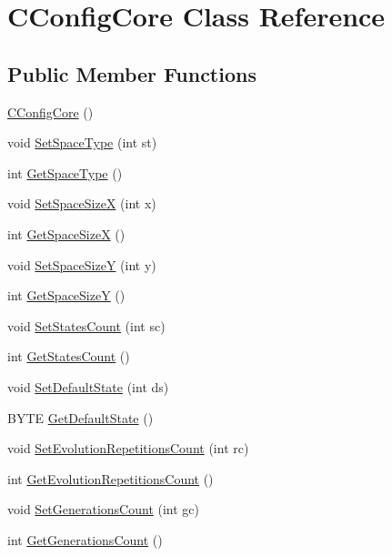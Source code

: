 \hypertarget{classCConfigCore}{
\section{CConfigCore Class Reference}
\label{classCConfigCore}
}
\subsection*{Public Member Functions}
\begin{DoxyCompactItemize}
\item 
\hyperlink{classCConfigCore_a09fdbc421e962fcd0b5ade4db4b21f81}{CConfigCore} ()
\item 
void \hyperlink{classCConfigCore_a698e21d3cc2db7224c8941e3a1505e2a}{SetSpaceType} (int st)
\item 
int \hyperlink{classCConfigCore_a8b06869bfd0a1af47fdd3afc517518d1}{GetSpaceType} ()
\item 
void \hyperlink{classCConfigCore_aed690b7f40faa31694167d5e136e0b54}{SetSpaceSizeX} (int x)
\item 
int \hyperlink{classCConfigCore_aaef0d960846dbe913d073c7aa4634693}{GetSpaceSizeX} ()
\item 
void \hyperlink{classCConfigCore_aada43aac83e4c9ea617f19dd5facc143}{SetSpaceSizeY} (int y)
\item 
int \hyperlink{classCConfigCore_a0a6cce7f05b9c29afa2986059dc0ecaf}{GetSpaceSizeY} ()
\item 
void \hyperlink{classCConfigCore_ac9c465fc1a620c5be2556b02d562b245}{SetStatesCount} (int sc)
\item 
int \hyperlink{classCConfigCore_aff904b7ad2955b6ac7632a967ce73058}{GetStatesCount} ()
\item 
void \hyperlink{classCConfigCore_afde874d899af969cfd1a3cd08dba4234}{SetDefaultState} (int ds)
\item 
BYTE \hyperlink{classCConfigCore_a7623630f4d5737b312f729d312586133}{GetDefaultState} ()
\item 
void \hyperlink{classCConfigCore_ad9e4114043065f44391aa83e73670777}{SetEvolutionRepetitionsCount} (int rc)
\item 
int \hyperlink{classCConfigCore_a44d31a6c355762c899b740c69114d47a}{GetEvolutionRepetitionsCount} ()
\item 
void \hyperlink{classCConfigCore_a80569c4ff831e863896ba20e8847d931}{SetGenerationsCount} (int gc)
\item 
int \hyperlink{classCConfigCore_ae4dbc2fe07b0c5efa776a2e4ccfb47e4}{GetGenerationsCount} ()

\end{DoxyCompactItemize}
